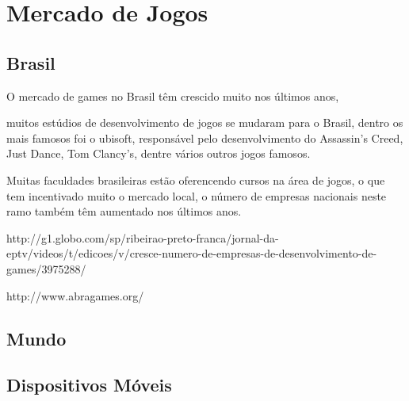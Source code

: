 
\chapter{Mercado de Jogos}
\label{cap:mercadoJogos}


\section{Brasil}

O mercado de games no Brasil têm crescido muito nos últimos anos, 

muitos estúdios de desenvolvimento de jogos se mudaram para o Brasil, dentro os mais famosos foi o ubisoft, responsável pelo desenvolvimento do Assassin's Creed, Just Dance, Tom Clancy's, dentre vários outros jogos famosos.

Muitas faculdades brasileiras estão oferencendo cursos na área de jogos, o que tem incentivado muito o mercado local, o número de empresas nacionais neste ramo também têm aumentado nos últimos anos.








http://g1.globo.com/sp/ribeirao-preto-franca/jornal-da-eptv/videos/t/edicoes/v/cresce-numero-de-empresas-de-desenvolvimento-de-games/3975288/

http://www.abragames.org/








\section{Mundo}



\section{Dispositivos Móveis}

